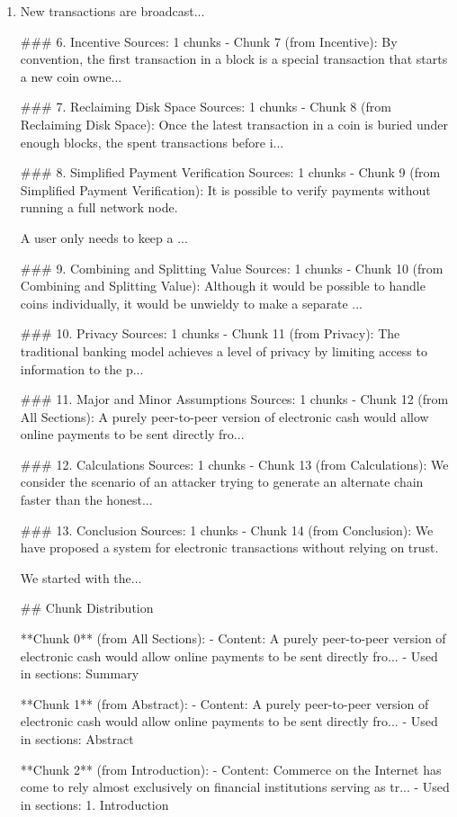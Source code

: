 \begin{enumerate}
\item New transactions are broadcast...

### 6. Incentive
Sources: 1 chunks
- Chunk 7 (from Incentive): By convention, the first transaction in a block is a special transaction that starts a new coin owne...

### 7. Reclaiming Disk Space
Sources: 1 chunks
- Chunk 8 (from Reclaiming Disk Space): Once the latest transaction in a coin is buried under enough blocks, the spent transactions before i...

### 8. Simplified Payment Verification
Sources: 1 chunks
- Chunk 9 (from Simplified Payment Verification): It is possible to verify payments without running a full network node.

A user only needs to keep a ...

### 9. Combining and Splitting Value
Sources: 1 chunks
- Chunk 10 (from Combining and Splitting Value): Although it would be possible to handle coins individually, it would be unwieldy to make a separate ...

### 10. Privacy
Sources: 1 chunks
- Chunk 11 (from Privacy): The traditional banking model achieves a level of privacy by limiting access to information to the p...

### 11. Major and Minor Assumptions
Sources: 1 chunks
- Chunk 12 (from All Sections): A purely peer-to-peer version of electronic cash would allow online payments to be sent directly fro...

### 12. Calculations
Sources: 1 chunks
- Chunk 13 (from Calculations): We consider the scenario of an attacker trying to generate an alternate chain faster than the honest...

### 13. Conclusion
Sources: 1 chunks
- Chunk 14 (from Conclusion): We have proposed a system for electronic transactions without relying on trust.

We started with the...

## Chunk Distribution

**Chunk 0** (from All Sections):
- Content: A purely peer-to-peer version of electronic cash would allow online payments to be sent directly fro...
- Used in sections: Summary

**Chunk 1** (from Abstract):
- Content: A purely peer-to-peer version of electronic cash would allow online payments to be sent directly fro...
- Used in sections: Abstract

**Chunk 2** (from Introduction):
- Content: Commerce on the Internet has come to rely almost exclusively on financial institutions serving as tr...
- Used in sections: 1. Introduction


\end{enumerate}
